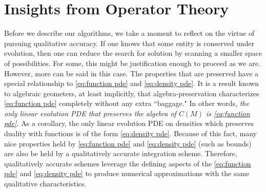 \documentclass[final,leqno]{siamart}
\begin{document}
%
%


\section{Insights from Operator Theory}
\label{sec:operator theory}
Before we describe our algorithms, we take a moment to reflect on the virtue of pursuing qualitative accuracy.
If one knows that some entity is conserved under evolution, then one can reduce the search for solution by scanning a smaller space of possibilities.
For some, this might be justification enough to proceed as we are.
However, more can be said in this case.
The properties that are preserved have a special relationship to \eqref{eq:function pde} and \eqref{eq:density pde}.
It is a result known to algebraic geometers, at least implicitly, that algebra-preservation characterizes \eqref{eq:function pde} completely without any extra ``baggage."
In other words, \emph{the only linear evolution PDE that preserves the algebra of $C(M)$ is \eqref{eq:function pde}.}
As a corollary, the only linear evolution PDE on densities which preserves duality with functions is of the form \eqref{eq:density pde}.
Because of this fact, many nice properties held by \eqref{eq:function pde} and \eqref{eq:density pde} (such as bounds) are also be held by a qualitatively accurate integration scheme.
Therefore, qualitatively accurate schemes leverage the defining aspects of the \eqref{eq:function pde} and \eqref{eq:density pde} to produce numerical approximations with the same qualitative characteristics.
\end{document}
